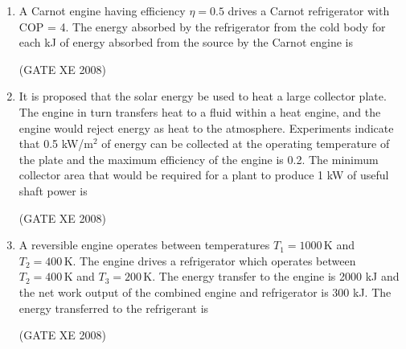 \documentclass[12pt]{article}
\begin{document}
\begin{enumerate}
(GATE XE 2008)

\item  A Carnot engine having efficiency $\eta = 0.5$ drives a Carnot refrigerator with COP = 4. The energy absorbed by the refrigerator from the cold body for each kJ of energy absorbed from the source by the Carnot engine is  

\begin{enumerate}
\end{enumerate}

(GATE XE 2008)

\item  It is proposed that the solar energy be used to heat a large collector plate. The engine in turn transfers heat to a fluid within a heat engine, and the engine would reject energy as heat to the atmosphere. Experiments indicate that 0.5 kW/m$^2$ of energy can be collected at the operating temperature of the plate and the maximum efficiency of the engine is 0.2. The minimum collector area that would be required for a plant to produce 1 kW of useful shaft power is  

\begin{enumerate}
\end{enumerate}

(GATE XE 2008)

\item  A reversible engine operates between temperatures $T_1 = 1000 \, \mathrm{K}$ and $T_2 = 400 \, \mathrm{K}$. The engine drives a refrigerator which operates between $T_2 = 400 \, \mathrm{K}$ and $T_3 = 200 \, \mathrm{K}$. The energy transfer to the engine is 2000 kJ and the net work output of the combined engine and refrigerator is 300 kJ. The energy transferred to the refrigerant is  

\begin{enumerate}
\end{enumerate}
(GATE XE 2008)


\end{enumerate}
\end{document}
